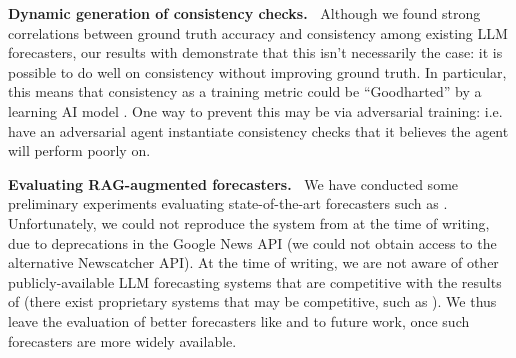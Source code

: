 \textbf{Dynamic generation of consistency checks.~}
Although we found strong correlations between ground truth accuracy and consistency among existing LLM forecasters, our results with \CFCaster{} demonstrate that this isn't necessarily the case: it is possible to do well on consistency without improving ground truth. In particular, this means that consistency as a training metric could be ``Goodharted'' by a learning AI model \citep{karwowskiGoodhartsLawReinforcement2023}. One way to prevent this may be via adversarial training: i.e. have an adversarial agent instantiate consistency checks that it believes the agent will perform poorly on.


%

\textbf{Evaluating RAG-augmented forecasters.~}
\label{cfc/sec:cannot_evaluate_halawi}
We have conducted some preliminary experiments evaluating state-of-the-art forecasters such as \cite{halawiApproachingHumanLevelForecasting2024}.
Unfortunately, we could not reproduce the system from \cite{halawiApproachingHumanLevelForecasting2024} at the time of writing, due to deprecations in the Google News API (we could not obtain access to the alternative Newscatcher API).
At the time of writing, we are not aware of other publicly-available LLM forecasting systems that are competitive with the results of \cite{halawiApproachingHumanLevelForecasting2024}
(there exist proprietary systems that may be competitive, such as \cite{futuresearch2024}).
We thus leave the evaluation of better forecasters like \cite{halawiApproachingHumanLevelForecasting2024} and \cite{safeai2024forecasters} to future work, once such forecasters are more widely available.



